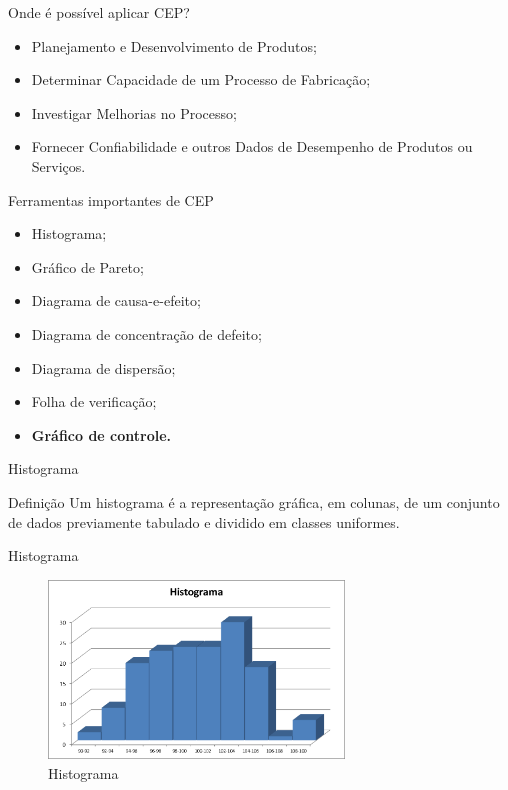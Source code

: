 \documentclass[12pt]{beamer}
\begin{document}
  \begin{frame}[t]{Onde é possível aplicar CEP?}
    \begin{itemize}
      \item Planejamento e Desenvolvimento de Produtos;

      \item Determinar Capacidade de um Processo de Fabricação;

      \item Investigar Melhorias no Processo;

      \item Fornecer Confiabilidade e outros Dados de Desempenho de Produtos ou Serviços.
    \end{itemize}
  \end{frame}

  \begin{frame}[t]{Ferramentas importantes de CEP}
    \begin{itemize}
      \item Histograma;

      \item Gráfico de Pareto;

      \item Diagrama de causa-e-efeito;

      \item Diagrama de concentração de defeito;

      \item Diagrama de dispersão;

      \item Folha de verificação;

      \item \textbf{Gráfico de controle.}
    \end{itemize}
  \end{frame}

  \begin{frame}[t]{Histograma}
    \begin{block}{Definição}
      Um histograma é a representação gráfica, em colunas, de um conjunto de dados previamente tabulado e dividido em classes uniformes.
    \end{block}
  \end{frame}

  \begin{frame}{Histograma}
    \begin{figure}[ht]
      \includegraphics[width=0.7\textwidth]{img/histograma-industria}
      \caption{Histograma}
    \end{figure}
  \end{frame}
\end{document}
